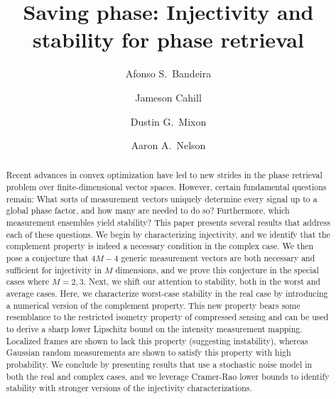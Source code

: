 \documentclass[times,10pt]{elsarticle}
\theoremstyle{plain}
\begin{document}
\title{Saving phase: Injectivity and stability for phase retrieval}





\author[princeton]{Afonso S.\ Bandeira}
\author[missouri]{Jameson Cahill}
\author[afit]{Dustin G.\ Mixon}
\author[afit]{Aaron A.\ Nelson}

\address[princeton]{Program in Applied and Computational Mathematics (PACM), Princeton University, Princeton, NJ 08544}
\address[missouri]{Department of Mathematics, University of Missouri, Columbia, MO 65211}
\address[afit]{Department of Mathematics and Statistics, Air Force Institute of Technology, Wright-Patterson Air Force Base, OH 45433}

\begin{abstract}
Recent advances in convex optimization have led to new strides in the phase retrieval problem over finite-dimensional vector spaces.
However, certain fundamental questions remain:
What sorts of measurement vectors uniquely determine every signal up to a global phase factor, and how many are needed to do so?
Furthermore, which measurement ensembles yield stability?
This paper presents several results that address each of these questions.
We begin by characterizing injectivity, and we identify that the complement property is indeed a necessary condition in the complex case.
We then pose a conjecture that $4M-4$ generic measurement vectors are both necessary and sufficient for injectivity in $M$ dimensions, and we prove this conjecture in the special cases where $M=2,3$.
Next, we shift our attention to stability, both in the worst and average cases.
Here, we characterize worst-case stability in the real case by introducing a numerical version of the complement property.
This new property bears some resemblance to the restricted isometry property of compressed sensing and can be used to derive a sharp lower Lipschitz bound on the intensity measurement mapping.
Localized frames are shown to lack this property (suggesting instability), whereas Gaussian random measurements are shown to satisfy this property with high probability.
We conclude by presenting results that use a stochastic noise model in both the real and complex cases, and we leverage Cramer-Rao lower bounds to identify stability with stronger versions of the injectivity characterizations.
\end{abstract}
\end{document}
